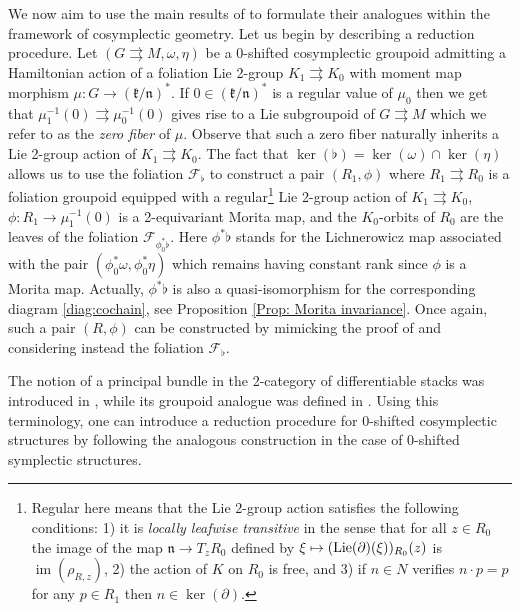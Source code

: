 \documentclass[
  a4paper, 
  reqno, 
  oneside, 
  12pt
]{amsart}
\theoremstyle{definition}
\theoremstyle{remark}
\DeclareMathOperator{\im}{im}
\newcommand{\rr}{\rightrightarrows}
\begin{document}
We now aim to use the main results of \cite{HoffmanSjamaar} to formulate their analogues within the framework of cosymplectic geometry. Let us begin by describing a reduction procedure. Let $(G\rr M,\omega,\eta)$ be a 0-shifted cosymplectic groupoid admitting a Hamiltonian action of a foliation Lie 2-group $K_1\rr K_0$ with moment map morphism $\mu:G\to (\mathfrak{k}/\mathfrak{n})^\ast$. If $0\in (\mathfrak{k}/\mathfrak{n})^\ast$ is a regular value of $\mu_0$ then we get that $\mu_1^{-1}(0)\rr \mu_0^{-1}(0)$ gives rise to a Lie subgroupoid of $G\rr M$ which we refer to as the \emph{zero fiber} of $\mu$. Observe that such a zero fiber naturally inherits a Lie 2-group action of $K_1\rr K_0$. The fact that $\ker(\flat)=\ker(\omega)\cap \ker(\eta)$ allows us to use the foliation $\mathcal{F}_\flat$ to construct a pair $(R_1,\phi)$ where $R_1\rr R_0$ is a foliation groupoid equipped with a regular\footnote{Regular here means that the Lie 2-group action satisfies the following conditions: 1) it is \emph{locally leafwise transitive} in the sense that for all $z\in R_0$ the image of the map $\mathfrak{n}\to T_z R_0$ defined by $\xi\mapsto (\textnormal{Lie}(\partial)(\xi))_{R_0}(z)$ is $\im(\rho_{R,z})$, 2) the action of $K$ on $R_0$ is free, and 3) if $n\in N$ verifies $n\cdot p=p$ for any $p\in R_1$ then $n\in \ker(\partial)$.} Lie 2-group action of $K_1\rr K_0$, $\phi: R_1\to \mu_1^{-1}(0)$ is a 2-equivariant Morita map, and the $K_0$-orbits of $R_0$ are the leaves of the foliation $\mathcal{F}_{\phi_0^\ast \flat}$. Here $\phi^\ast \flat$ stands for the Lichnerowicz map associated with the pair $(\phi_0^\ast \omega, \phi_0^\ast \eta)$ which remains having constant rank since $\phi$ is a Morita map. Actually, $\phi^\ast \flat$ is also a quasi-isomorphism for the corresponding diagram \eqref{diag:cochain}, see Proposition \ref{Prop: Morita invariance}. Once again, such a pair $(R,\phi)$ can be constructed by mimicking the proof of \cite[Prop. 8.2.1]{HoffmanSjamaar} and considering instead the foliation $\mathcal{F}_\flat$. 

The notion of a principal bundle in the 2-category of differentiable stacks was introduced in \cite{BursztynNosedaZhu}, while its groupoid analogue was defined in \cite[s. 6.13]{HoffmanSjamaar}. Using this terminology, one can introduce a reduction procedure for $0$-shifted cosymplectic structures by following the analogous construction in the case of 0-shifted symplectic structures. 
\end{document}
